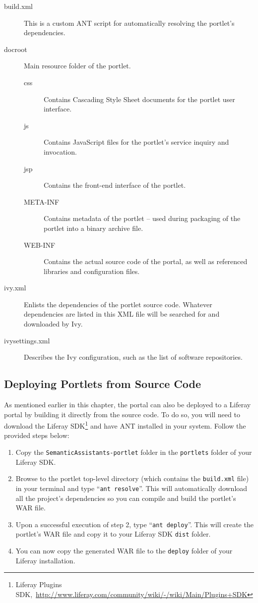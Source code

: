 \begin{description}
\item [build.xml] This is a custom ANT script for automatically resolving the portlet's dependencies.
\item [docroot] Main resource folder of the portlet.
\begin{description}
\item[css] Contains Cascading Style Sheet documents for the portlet user interface.
\item[js] Contains JavaScript files for the portlet's service inquiry and invocation.
\item[jsp] Contains the front-end interface of the portlet.
\item[META-INF] Contains metadata of the portlet -- used during packaging of the portlet into a binary archive file.
\item[WEB-INF] Contains the actual source code of the portal, as well as referenced libraries and configuration files.
\end{description}

\item [ivy.xml] Enlists the dependencies of the portlet source code. Whatever dependencies are listed in this XML file will be searched for and downloaded by Ivy.
\item [ivysettings.xml] Describes the Ivy configuration, such as the list of software repositories.
\end{description}

\subsection{Deploying Portlets from Source Code}
\label{sec:src_deploy}
As mentioned earlier in this chapter, the \sa portal can also be deployed to a Liferay portal by building it directly from the source code. To do so, you will need to download the Liferay SDK\footnote{Liferay Plugins SDK,~\url{http://www.liferay.com/community/wiki/-/wiki/Main/Plugins+SDK}} and have ANT installed in your system. Follow the provided steps below:

\begin{enumerate}
\item Copy the \texttt{SemanticAssistants-portlet} folder in the \texttt{portlets} folder of your Liferay SDK.
\item Browse to the \sa portlet top-level directory (which contains the \texttt{build.xml} file) in your terminal and type ``\texttt{ant resolve}''. This will automatically download all the project's dependencies so you can compile and build the portlet's WAR file.
\item Upon a successful execution of step 2, type ``\texttt{ant deploy}''. This will create the portlet's WAR file and copy it to your Liferay SDK \texttt{dist} folder.
\item You can now copy the generated WAR file to the \texttt{deploy} folder of your Liferay installation.
\end{enumerate}

